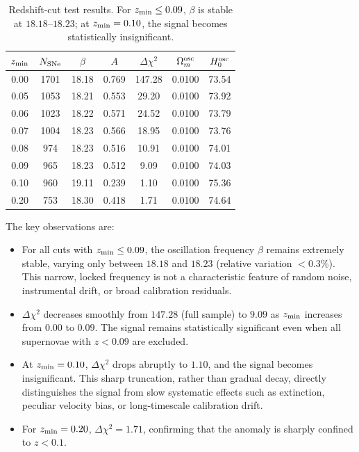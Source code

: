 \documentclass[10pt,a4paper,twocolumn]{article}
\begin{document}
\begin{table}[ht]
\centering
\setlength{\tabcolsep}{3.0pt}
\caption{\label{tab:cut}Redshift-cut test results. For $z_{\rm min}\le0.09$, $\beta$ is stable at $18.18$–$18.23$; at $z_{\rm min}=0.10$, the signal becomes statistically insignificant.}
\begin{tabular}{ccccccc}
\toprule
$z_{\rm min}$ & $N_{\rm SNe}$ & $\beta$ & $A$ & $\Delta\chi^2$ & $\Omega_m^{\rm osc}$ & $H_0^{\rm osc}$ \\
\midrule
0.00 & 1701 & 18.18 & 0.769 & 147.28 & 0.0100 & 73.54 \\
0.05 & 1053 & 18.21 & 0.553 & 29.20 & 0.0100 & 73.92 \\
0.06 & 1023 & 18.22 & 0.571 & 24.52 & 0.0100 & 73.79 \\
0.07 & 1004 & 18.23 & 0.566 & 18.95 & 0.0100 & 73.76 \\
0.08 & 974  & 18.23 & 0.516 & 10.91 & 0.0100 & 74.01 \\
0.09 & 965  & 18.23 & 0.512 &  9.09 & 0.0100 & 74.03 \\
0.10 & 960  & 19.11 & 0.239 &  1.10 & 0.0100 & 75.36 \\
0.20 & 753  & 18.30 & 0.418 &  1.71 & 0.0100 & 74.64 \\
\bottomrule
\end{tabular}
\end{table}

The key observations are:
\begin{itemize}
    \item For all cuts with $z_{\rm min}\le0.09$, the oscillation frequency $\beta$ remains extremely stable, varying only between $18.18$ and $18.23$ (relative variation $<0.3\%$). This narrow, locked frequency is not a characteristic feature of random noise, instrumental drift, or broad calibration residuals.
    \item $\Delta\chi^2$ decreases smoothly from $147.28$ (full sample) to $9.09$ as $z_{\rm min}$ increases from $0.00$ to $0.09$. The signal remains statistically significant even when all supernovae with $z<0.09$ are excluded.
    \item At $z_{\rm min}=0.10$, $\Delta\chi^2$ drops abruptly to $1.10$, and the signal becomes insignificant. This sharp truncation, rather than gradual decay, directly distinguishes the signal from slow systematic effects such as extinction, peculiar velocity bias, or long-timescale calibration drift.
    \item For $z_{\rm min}=0.20$, $\Delta\chi^2=1.71$, confirming that the anomaly is sharply confined to $z<0.1$.
\end{itemize}
\end{document}
